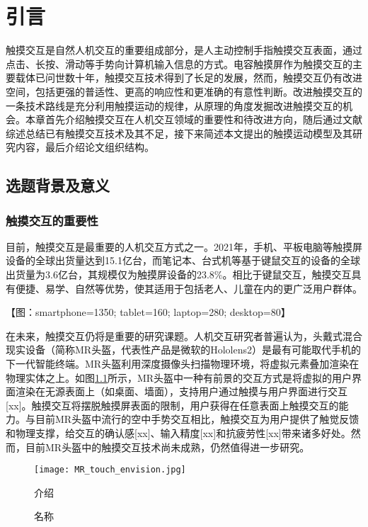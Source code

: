 
\chapter{引言}

触摸交互是自然人机交互的重要组成部分，是人主动控制手指触摸交互表面，通过点击、长按、滑动等手势向计算机输入信息的方式。电容触摸屏作为触摸交互的主要载体已问世数十年，触摸交互技术得到了长足的发展，然而，触摸交互仍有改进空间，包括更强的普适性、更高的响应性和更准确的有意性判断。改进触摸交互的一条技术路线是充分利用触摸运动的规律，从原理的角度发掘改进触摸交互的机会。本章首先介绍触摸交互在人机交互领域的重要性和待改进方向，随后通过文献综述总结已有触摸交互技术及其不足，接下来简述本文提出的触摸运动模型及其研究内容，最后介绍论文组织结构。

\section{选题背景及意义}

\subsection{触摸交互的重要性}

目前，触摸交互是最重要的人机交互方式之一。2021年，手机、平板电脑等触摸屏设备的全球出货量达到15.1亿台，而笔记本、台式机等基于键鼠交互的设备的全球出货量为3.6亿台\cite{alsop2020shipment}，其规模仅为触摸屏设备的23.8\%。相比于键鼠交互，触摸交互具有便捷、易学、自然等优势，使其适用于包括老人、儿童在内的更广泛用户群体。

【图：smartphone=1350; tablet=160; laptop=280; desktop=80】

在未来，触摸交互仍将是重要的研究课题。人机交互研究者普遍认为，头戴式混合现实设备（简称MR头盔，代表性产品是微软的Hololens2）是最有可能取代手机的下一代智能终端。MR头盔利用深度摄像头扫描物理环境，将虚拟元素叠加渲染在物理实体之上。如图\ref{fig:MR_touch_envision}所示，MR头盔中一种有前景的交互方式是将虚拟的用户界面渲染在无源表面上（如桌面、墙面），支持用户通过触摸与用户界面进行交互[xx]。触摸交互将摆脱触摸屏表面的限制，用户获得在任意表面上触摸交互的能力。与目前MR头盔中流行的空中手势交互相比，触摸交互为用户提供了触觉反馈和物理支撑，给交互的确认感[xx]、输入精度[xx]和抗疲劳性[xx]带来诸多好处。然而，目前MR头盔中的触摸交互技术尚未成熟，仍然值得进一步研究。

\begin{figure}
	\centering
	\texttt{[image: MR\_touch\_envision.jpg]}
	\caption*{介绍}
	\caption{名称}
	\label{fig:MR_touch_envision}
\end{figure}


